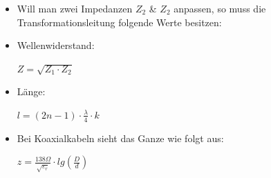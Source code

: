 \begin{frame}
\begin{itemize}
	\item	Will man zwei Impedanzen $Z_2$ \& $Z_2$ anpassen, so muss die Transformationsleitung folgende Werte besitzen:
	\item	Wellenwiderstand:\\ 
	\vspace{2mm}
	\begin{Large}	
	$Z = \sqrt{Z_1 \cdot Z_2}$
	\end{Large}
	\vspace{2mm}
	\item	Länge: \\ 
	\vspace{2mm}
	\begin{Large}
	$l = (2n - 1) \cdot \frac{\lambda}{4} \cdot k$
	\end{Large}
	\vspace{3mm}
	\item	Bei Koaxialkabeln sieht das Ganze wie folgt aus:
	\vspace{3mm}
	\begin{Large}
		$z = \frac{138 \Omega}{\sqrt{\varepsilon_r}} \cdot lg(\frac{D}{d})$
	\end{Large}		
\end{itemize}
\end{frame}

